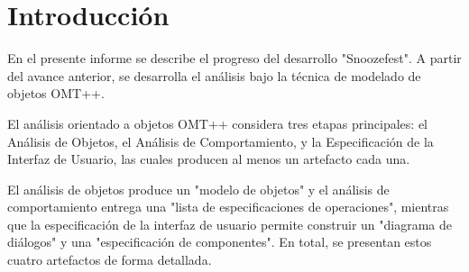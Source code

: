 \section{Introducción}
En el presente informe se describe el progreso del desarrollo "Snoozefest". A partir del avance anterior, se desarrolla el análisis bajo la técnica de modelado de objetos OMT++.

El análisis orientado a objetos OMT++ considera tres etapas principales: el Análisis de Objetos, el Análisis de Comportamiento, y la Especificación de la Interfaz de Usuario, las cuales producen al menos un artefacto cada una.

El análisis de objetos produce un "modelo de objetos" y el análisis de comportamiento entrega una "lista de especificaciones de operaciones", mientras que la especificación de la interfaz de usuario permite construir un "diagrama de diálogos" y una "especificación de componentes". En total, se presentan estos cuatro artefactos de forma detallada.
